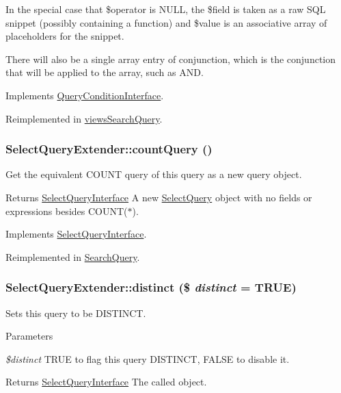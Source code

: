 In the special case that \$operator is NULL, the \$field is taken as a raw SQL snippet (possibly containing a function) and \$value is an associative array of placeholders for the snippet.

There will also be a single array entry of conjunction, which is the conjunction that will be applied to the array, such as AND. 

Implements \hyperlink{interfaceQueryConditionInterface_a894cc290ed61feb3693b1d459ae86888}{QueryConditionInterface}.

Reimplemented in \hyperlink{classviewsSearchQuery_a9e059c456dbd678823b8e937be92301e}{viewsSearchQuery}.\hypertarget{classSelectQueryExtender_a4c222f9407cc787f41b49be4b8ee26a5}{
\subsubsection[{countQuery}]{\setlength{\rightskip}{0pt plus 5cm}SelectQueryExtender::countQuery ()}}
\label{classSelectQueryExtender_a4c222f9407cc787f41b49be4b8ee26a5}
Get the equivalent COUNT query of this query as a new query object.

\begin{DoxyReturn}{Returns}
\hyperlink{interfaceSelectQueryInterface}{SelectQueryInterface} A new \hyperlink{classSelectQuery}{SelectQuery} object with no fields or expressions besides COUNT($\ast$). 
\end{DoxyReturn}


Implements \hyperlink{interfaceSelectQueryInterface_a48fd44b77e75771af6d3f289502f050e}{SelectQueryInterface}.

Reimplemented in \hyperlink{classSearchQuery_a01dea1649b1e99312abf12760b1b89e2}{SearchQuery}.\hypertarget{classSelectQueryExtender_a8e0cb58f3c0b4e6d535bf75703aad7bc}{
\subsubsection[{distinct}]{\setlength{\rightskip}{0pt plus 5cm}SelectQueryExtender::distinct (\$ {\em distinct} = {\ttfamily TRUE})}}
\label{classSelectQueryExtender_a8e0cb58f3c0b4e6d535bf75703aad7bc}
Sets this query to be DISTINCT.


\begin{DoxyParams}{Parameters}
\item[{\em \$distinct}]TRUE to flag this query DISTINCT, FALSE to disable it. \end{DoxyParams}
\begin{DoxyReturn}{Returns}
\hyperlink{interfaceSelectQueryInterface}{SelectQueryInterface} The called object. 
\end{DoxyReturn}


